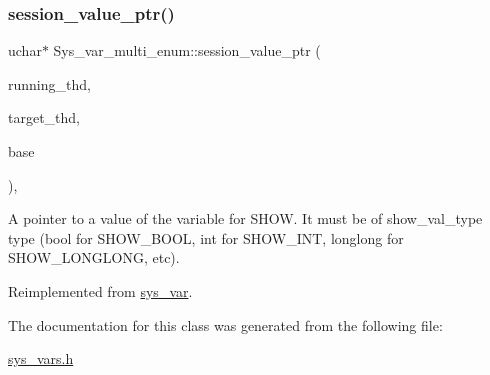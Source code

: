 \subsubsection{\texorpdfstring{session\+\_\+value\+\_\+ptr()}{session\_value\_ptr()}}
{\footnotesize\ttfamily uchar$\ast$ Sys\+\_\+var\+\_\+multi\+\_\+enum\+::session\+\_\+value\+\_\+ptr (\begin{DoxyParamCaption}\item[{T\+HD $\ast$}]{running\+\_\+thd,  }\item[{T\+HD $\ast$}]{target\+\_\+thd,  }\item[{L\+E\+X\+\_\+\+S\+T\+R\+I\+NG $\ast$}]{base }\end{DoxyParamCaption})\hspace{0.3cm}{\ttfamily [inline]}, {\ttfamily [virtual]}}

A pointer to a value of the variable for S\+H\+OW. It must be of show\+\_\+val\+\_\+type type (bool for S\+H\+O\+W\+\_\+\+B\+O\+OL, int for S\+H\+O\+W\+\_\+\+I\+NT, longlong for S\+H\+O\+W\+\_\+\+L\+O\+N\+G\+L\+O\+NG, etc). 

Reimplemented from \mbox{\hyperlink{classsys__var_a3e511591aaf555d2bc2ce40a80b7e899}{sys\+\_\+var}}.



The documentation for this class was generated from the following file\+:\begin{DoxyCompactItemize}
\item 
\mbox{\hyperlink{sys__vars_8h}{sys\+\_\+vars.\+h}}\end{DoxyCompactItemize}
